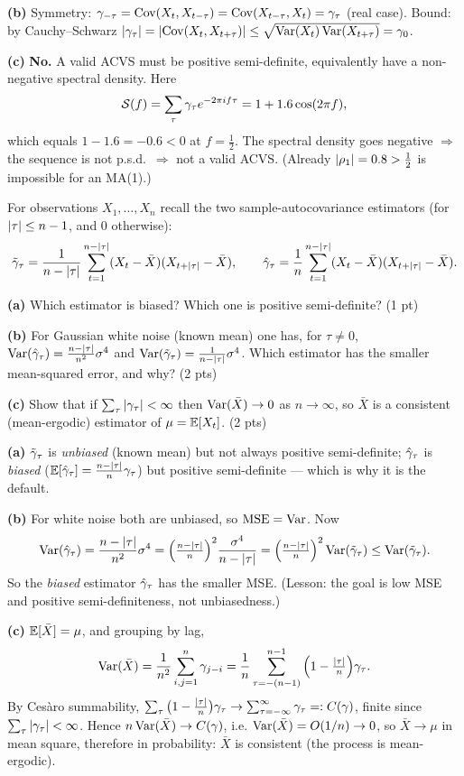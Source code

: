 \documentclass[11pt]{article}
\begin{document}
\textbf{(b)} Symmetry: $\gamma_{-\tau}=\operatorname{Cov}(X_t,X_{t-\tau})=\operatorname{Cov}(X_{t-\tau},X_t)=\gamma_\tau$ (real case). Bound: by Cauchy--Schwarz $\left\lvert \gamma_\tau \right\rvert=\left\lvert \operatorname{Cov}(X_t,X_{t+\tau}) \right\rvert\le\sqrt{\operatorname{Var}(X_t)\operatorname{Var}(X_{t+\tau})}=\gamma_0$.

\textbf{(c)} \textbf{No.} A valid ACVS must be positive semi-definite, equivalently have a non-negative spectral density. Here
\[
\mathcal{S}(f)=\sum_\tau\gamma_\tau e^{-2\pi i f\tau}=1+1.6\cos(2\pi f),
\]
which equals $1-1.6=-0.6<0$ at $f=\tfrac12$. The spectral density goes negative $\Rightarrow$ the sequence is not p.s.d.\ $\Rightarrow$ not a valid ACVS. (Already $\left\lvert \rho_1 \right\rvert=0.8>\tfrac12$ is impossible for an MA(1).)

\statementstart
For observations $X_1,\dots,X_n$ recall the two sample-autocovariance estimators (for $\left\lvert \tau \right\rvert\le n-1$, and $0$ otherwise):
\[
\tilde{\gamma}_\tau=\frac{1}{n-\left\lvert \tau \right\rvert}\sum_{t=1}^{n-\left\lvert \tau \right\rvert}(X_t-\bar X)(X_{t+\left\lvert \tau \right\rvert}-\bar X),\qquad
\hat{\gamma}_\tau=\frac{1}{n}\sum_{t=1}^{n-\left\lvert \tau \right\rvert}(X_t-\bar X)(X_{t+\left\lvert \tau \right\rvert}-\bar X).
\]

\textbf{(a)} Which estimator is biased? Which one is positive semi-definite? \hfill(1 pt)

\textbf{(b)} For Gaussian white noise (known mean) one has, for $\tau\ne0$, $\operatorname{Var}(\hat{\gamma}_\tau)=\tfrac{n-\left\lvert \tau \right\rvert}{n^2}\sigma^4$ and $\operatorname{Var}(\tilde{\gamma}_\tau)=\tfrac{1}{n-\left\lvert \tau \right\rvert}\sigma^4$. Which estimator has the smaller mean-squared error, and why? \hfill(2 pts)

\textbf{(c)} Show that if $\sum_{\tau}\left\lvert \gamma_\tau \right\rvert<\infty$ then $\operatorname{Var}(\bar X)\to0$ as $n\to\infty$, so $\bar X$ is a consistent (mean-ergodic) estimator of $\mu=\mathbb{E}[X_t]$. \hfill(2 pts)
\statementend

\textbf{(a)} $\tilde{\gamma}_\tau$ is \emph{unbiased} (known mean) but not always positive semi-definite; $\hat{\gamma}_\tau$ is \emph{biased} ($\mathbb{E}[\hat{\gamma}_\tau]=\tfrac{n-\left\lvert \tau \right\rvert}{n}\gamma_\tau$) but positive semi-definite --- which is why it is the default.

\textbf{(b)} For white noise both are unbiased, so $\operatorname{MSE}=\operatorname{Var}$. Now
\[
\operatorname{Var}(\hat{\gamma}_\tau)=\frac{n-\left\lvert \tau \right\rvert}{n^2}\sigma^4=\Big(\tfrac{n-\left\lvert \tau \right\rvert}{n}\Big)^2\frac{\sigma^4}{n-\left\lvert \tau \right\rvert}=\Big(\tfrac{n-\left\lvert \tau \right\rvert}{n}\Big)^2\operatorname{Var}(\tilde{\gamma}_\tau)\le\operatorname{Var}(\tilde{\gamma}_\tau).
\]
So the \emph{biased} estimator $\hat{\gamma}_\tau$ has the smaller MSE. (Lesson: the goal is low MSE and positive semi-definiteness, not unbiasedness.)

\textbf{(c)} $\mathbb{E}[\bar X]=\mu$, and grouping by lag,
\[
\operatorname{Var}(\bar X)=\frac1{n^2}\sum_{i,j=1}^n\gamma_{j-i}=\frac1n\sum_{\tau=-(n-1)}^{n-1}\Big(1-\tfrac{\left\lvert \tau \right\rvert}{n}\Big)\gamma_\tau .
\]
By Ces\`aro summability, $\sum_\tau\big(1-\tfrac{\left\lvert \tau \right\rvert}{n}\big)\gamma_\tau\to\sum_{\tau=-\infty}^\infty\gamma_\tau=:C(\gamma)$, finite since $\sum_\tau\left\lvert \gamma_\tau \right\rvert<\infty$. Hence $n\operatorname{Var}(\bar X)\to C(\gamma)$, i.e. $\operatorname{Var}(\bar X)=O(1/n)\to0$, so $\bar X\to\mu$ in mean square, therefore in probability: $\bar X$ is consistent (the process is mean-ergodic).
\end{document}
